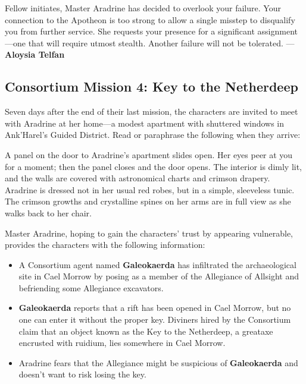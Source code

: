 \documentclass[letterpaper, 11pt, bg=full, twocolumn]{dndbook}
\begin{document}
\begin{DndReadAloud}
Fellow initiates,
Master Aradrine has decided to overlook your failure. Your connection to the Apotheon is too strong to allow a single misstep to disqualify you from further service. She requests your presence for a significant assignment---one that will require utmost stealth. Another failure will not be tolerated.
---\textbf{Aloysia Telfan}
\end{DndReadAloud}

\subsection{Consortium Mission 4: Key to the Netherdeep}

Seven days after the end of their last mission, the characters are invited to meet with Aradrine at her home---a modest apartment with shuttered windows in Ank'Harel's Guided District. Read or paraphrase the following when they arrive:

\begin{DndReadAloud}
A panel on the door to Aradrine's apartment slides open. Her eyes peer at you for a moment; then the panel closes and the door opens. The interior is dimly lit, and the walls are covered with astronomical charts and crimson drapery.
Aradrine is dressed not in her usual red robes, but in a simple, sleeveless tunic. The crimson growths and crystalline spines on her arms are in full view as she walks back to her chair.
\end{DndReadAloud}

Master Aradrine, hoping to gain the characters' trust by appearing vulnerable, provides the characters with the following information:

\begin{itemize}
\item A Consortium agent named \textbf{Galeokaerda} has infiltrated the archaeological site in Cael Morrow by posing as a member of the Allegiance of Allsight and befriending some Allegiance excavators.
\item \textbf{Galeokaerda} reports that a rift has been opened in Cael Morrow, but no one can enter it without the proper key. Diviners hired by the Consortium claim that an object known as the Key to the Netherdeep, a greataxe encrusted with ruidium, lies somewhere in Cael Morrow.
\item Aradrine fears that the Allegiance might be suspicious of \textbf{Galeokaerda} and doesn't want to risk losing the key.
\end{itemize}
\end{document}

